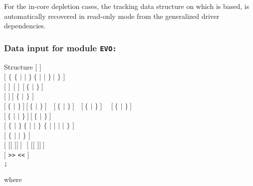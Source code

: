 For the in-core depletion cases, the tracking  data structure on which
 is based, is automatically recovered in read-only mode from the
generalized driver dependencies.

\subsubsection{Data input for module {\tt EVO:}}\label{sect:descevo}

\begin{DataStructure}{Structure }
$[$   $]$ \\
$[$ $\{$   $\{$  $|$  $|$  $\}~\{$
  $|$   $|$   $\}~|$
 $\}$ $]$ \\
$[$   $]~~[$   $]~~[~\{$   $|$  $\}~]$ \\
$[$   $]~[$ $\{$  $|$  $\}$ $]$ \\
$[~\{$  $|$  $\}~]~[~\{$ $|$ $\}~]$~~$[~\{$ $|$ $\}~]$~~$[~\{$ $|$ $\}~]$~~
$[~\{$ $|$ $\}~]$ \\
$[~\{$ $|$  $|$  $\}~]~[~\{$  $|$  $\}~]$ \\
$[$  $\{$  $|$  $\}~\{$  $|$  $|$  $\}$ $\{$  $|$
  $|$   $|$   $|$  $\}$ $]$ \\
$[$   $\{$  $|$  $|$  $\}$ $]$ \\
$[$  $[[$  $]] ~]~~~[$  $[[$  $]] ~]$ \\
$[$   {\tt >>}  {\tt <<} $]$ \\
{\tt ;}
\end{DataStructure}

\noindent
where

